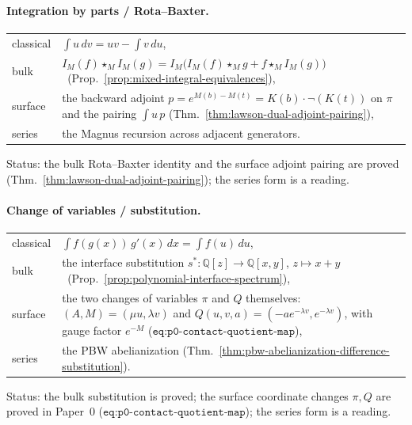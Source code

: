 \paragraph{Integration by parts / Rota--Baxter.} \hfill
\begin{center}
\begin{tabular}{lp{}}
classical & $\int u\,dv=uv-\int v\,du$,\\[2pt]
bulk & $I_M(f)\star_M I_M(g)=I_M\bigl(I_M(f)\star_M g+f\star_M I_M(g)\bigr)$
  \ (Prop.~\ref{prop:mixed-integral-equivalences}),\\[2pt]
surface & the backward adjoint $p=e^{M(b)-M(t)}=K(b)\cdot\neg(K(t))$ on $\pi$
  and the pairing $\int u\,p$
  (Thm.~\ref{thm:lawson-dual-adjoint-pairing}),\\[2pt]
series & the Magnus recursion across adjacent generators.
\end{tabular}
\end{center}
{\small Status: the bulk Rota--Baxter identity and the surface adjoint pairing
are proved (Thm.~\ref{thm:lawson-dual-adjoint-pairing}); the series form is a
reading.}

\paragraph{Change of variables / substitution.} \hfill
\begin{center}
\begin{tabular}{lp{}}
classical & $\int f(g(x))\,g'(x)\,dx=\int f(u)\,du$,\\[2pt]
bulk & the interface substitution $s^*:\mathbb Q[z]\to\mathbb Q[x,y]$, $z\mapsto x+y$
  \ (Prop.~\ref{prop:polynomial-interface-spectrum}),\\[2pt]
surface & the two changes of variables $\pi$ and $Q$ themselves:
  $(A,M)=(\mu u,\lambda v)$ and
  $Q(u,v,a)=(-ae^{-\lambda v},e^{-\lambda v})$, with gauge factor $e^{-M}$
  ($\texttt{eq:p0-contact-quotient-map}$),\\[2pt]
series & the PBW abelianization
  (Thm.~\ref{thm:pbw-abelianization-difference-substitution}).
\end{tabular}
\end{center}
{\small Status: the bulk substitution is proved; the surface coordinate changes
$\pi,Q$ are proved in Paper~0 ($\texttt{eq:p0-contact-quotient-map}$); the series
form is a reading.}

